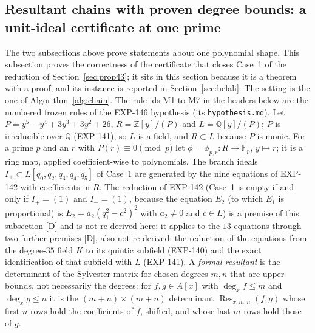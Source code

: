 \documentclass[11pt]{article}
\theoremstyle{remark}
\newcommand{\Q}{\mathbb{Q}}
\begin{document}
\subsection{Resultant chains with proven degree bounds: a unit-ideal certificate at one prime}\label{sec:chaintheory}

The two subsections above prove statements about one polynomial shape. This subsection proves the correctness of the certificate that closes Case~1 of the
reduction of Section~\ref{sec:prop43}; it sits in this section because it is a theorem with a proof, and its instance is reported in Section~\ref{sec:helali}.
The setting is the one of Algorithm~\ref{alg:chain}. The rule ids M1 to M7 in the headers below are the numbered frozen rules of the EXP-146 hypothesis (its \texttt{hypothesis.md}). Let $P=y^5-y^4+3y^3+3y^2+26$, $R=\mathbb Z[y]/(P)$ and $L=\Q[y]/(P)$; $P$ is irreducible over $\Q$ (EXP-141), so $L$ is a field,
and $R\subset L$ because $P$ is monic. For a prime $p$ and an $r$ with $P(r)\equiv0\pmod p$ let
$\phi=\phi_{p,r}\colon R\to\mathbb F_p$, $y\mapsto r$; it is a ring map, applied coefficient-wise to polynomials. The branch ideals $I_\pm\subset L[q_0,q_2,q_3,q_4,q_5]$ of Case~1 are generated by the nine
equations of EXP-142 with coefficients in $R$. The reduction of EXP-142 (Case~1 is empty if and only if $I_+=(1)$ and $I_-=(1)$, because the equation $E_2$ (to which $E_1$ is proportional) is $E_2=a_2(q_1^2-c^2)^2$ with $a_2\ne0$ and $c\in L$) is a premise of this subsection [D] and is not re-derived here; it applies to the $13$ equations through two further premises [D], also not re-derived: the reduction of the equations from the degree-$35$ field $K$ to its quintic subfield (EXP-140) and the exact identification of that subfield with $L$ (EXP-141). A \emph{formal resultant} is the determinant of the
Sylvester matrix for chosen degrees $m,n$ that are upper bounds, not necessarily the degrees: for $f,g\in A[x]$ with $\deg_xf\le m$ and $\deg_xg\le n$ it is the $(m+n)\times(m+n)$ determinant $\operatorname{Res}_{x;m,n}(f,g)$
whose first $n$ rows hold the coefficients of $f$, shifted, and whose last $m$ rows hold those of $g$.
\end{document}
